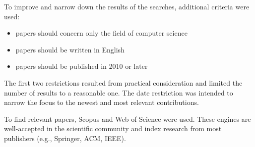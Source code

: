 To improve and narrow down the results of the searches, additional criteria were used:
\begin{samepage}
\begin{itemize}
    \item papers should concern only the field of computer science
    \item papers should be written in English
    \item papers should be published in 2010 or later
\end{itemize}
\end{samepage}

The first two restrictions resulted from practical consideration and limited the number of results to a reasonable one.
The date restriction was intended to narrow the focus to the newest and most relevant contributions.

To find relevant papers, Scopus and Web of Science were used.
These engines are well-accepted in the scientific community and index research from most publishers (e.g., Springer, ACM, IEEE).
